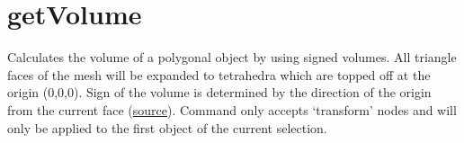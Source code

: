 \documentclass[letterpaper,10pt,english]{sphinxmanual}
\begin{document}
\section{getVolume}
\label{pk_src.getVolume:getvolume}\label{pk_src.getVolume::doc}\label{pk_src.getVolume:id1}
{\hyperref[index:commands]{}}
\label{pk_src.getVolume:module-pk_src.getVolume}
Calculates the volume of a polygonal object by using signed volumes.
All triangle faces of the mesh will be expanded to tetrahedra which are topped off at the origin (0,0,0). Sign of the volume is determined by the direction of the origin from the current face
(\href{http://stackoverflow.com/questions/1406029/how-to-calculate-the-volume-of-a-3d-mesh-object-the-surface-of-which-is-made-up}{source}).
Command only accepts `transform' nodes and will only be applied to the first object of the current selection.
\end{document}
